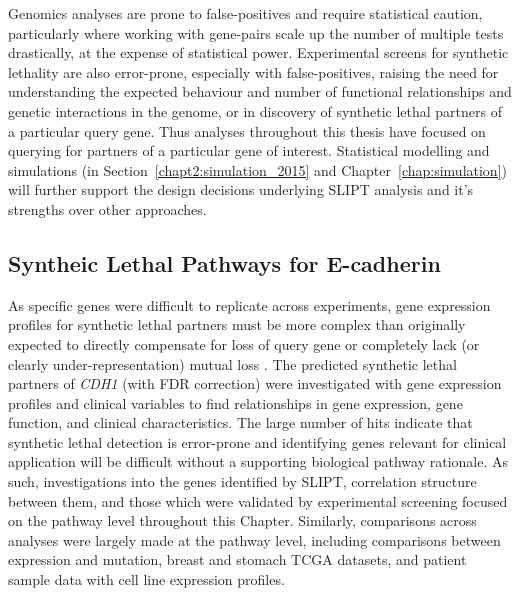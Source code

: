 Genomics analyses are prone to false-positives and require statistical caution, particularly where working with gene-pairs scale up the number of multiple tests drastically, at the expense of statistical power.  Experimental screens for synthetic lethality are also error-prone, especially with false-positives, raising the need for understanding the expected behaviour and number of functional relationships and genetic interactions in the genome, or in discovery of synthetic lethal partners of a particular query gene. Thus analyses throughout this thesis have focused on querying for partners of a particular gene of interest. Statistical modelling and simulations (in Section~\ref{chapt2:simulation_2015} and Chapter~\ref{chap:simulation}) will further support the design decisions underlying SLIPT analysis and it's strengths over other approaches.

\subsection{Syntheic Lethal Pathways for E-cadherin}

As specific genes were difficult to replicate across experiments, gene expression profiles for synthetic lethal partners must be more complex than originally expected to directly compensate for loss of query gene or completely lack (or clearly under-represent\-ation) mutual loss \citep{Kelly2013, Jerby2014, Lu2015}. The predicted synthetic lethal partners of \textit{CDH1} (with FDR correction) were investigated with gene expression profiles and clinical variables to find relationships in gene expression, gene function, and clinical characteristics. The large number of hits indicate that synthetic lethal detection is error-prone and identifying genes relevant for clinical application will be difficult without a supporting biological pathway rationale. As such, investigations into the genes identified by SLIPT, correlation structure between them, and those which were validated by experimental screening \citep{Telford2015} focused on the pathway level throughout this Chapter. Similarly, comparisons across analyses were largely made at the pathway level, including comparisons between expression and mutation, breast and stomach TCGA datasets, and patient sample data with cell line expression profiles.

